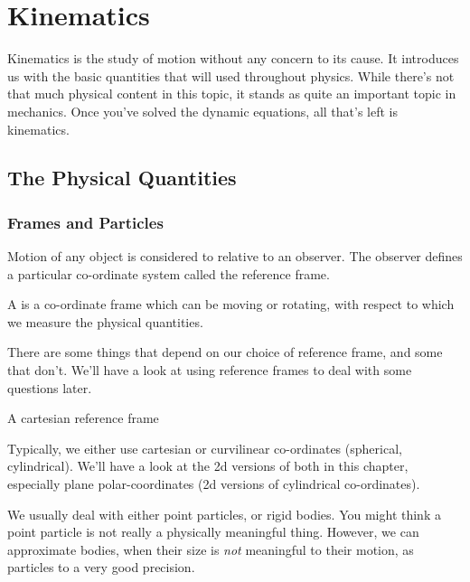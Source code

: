\setlength{\chnumsep}{10em}
\chapter{Kinematics}


\begin{overview}
    Kinematics is the study of motion without any concern to its cause. It introduces us with the 
    basic quantities that will used throughout physics. While there's not that much physical content in this 
    topic, it stands as quite an important topic in mechanics. Once you've solved the dynamic equations, all 
    that's left is kinematics.
        \end{overview}

\section{The Physical Quantities}

\subsection{Frames and Particles}

Motion of any object is considered to relative to an observer. The observer defines a
particular co-ordinate system called the reference frame.

\begin{definition}
    A  is a co-ordinate frame which can be moving or rotating, with respect to 
    which we measure the physical quantities.
\end{definition}

There are some things that depend on our choice of reference frame, and some that
don't. We'll have a look at using reference frames to deal with some questions
later. 

\begin{marginfigure}
    \vspace{-5em}
    \caption{A cartesian reference frame}
\end{marginfigure}


Typically, we either use cartesian or curvilinear co-ordinates (spherical, cylindrical). 
We'll have a look at the 2d versions of both in this chapter, especially plane polar-coordinates 
(2d versions of cylindrical co-ordinates).

We usually deal with either point particles, or rigid bodies.  You might think a point 
particle is not really a physically meaningful thing. However, we can
approximate bodies, when their size is \emph{not} meaningful to their
motion, as particles to a very good precision. 

